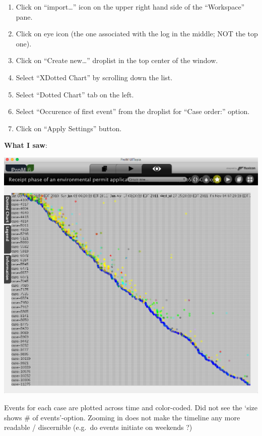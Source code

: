 \documentclass[]{article}
\begin{document}
\begin{enumerate}
\def\labelenumi{\arabic{enumi}.}
\itemsep1pt\parskip0pt
\item
  Click on ``import\ldots{}'' icon on the upper right hand side of the
  ``Workspace'' pane.\\
\item
  Click on eye icon (the one associated with the log in the middle; NOT
  the top one).\\
\item
  Click on ``Create new\ldots{}'' droplist in the top center of the
  window.\\
\item
  Select ``XDotted Chart'' by scrolling down the list.
\item
  Select ``Dotted Chart'' tab on the left.
\item
  Select ``Occurence of first event'' from the droplist for ``Case
  order:'' option.\\
\item
  Click on ``Apply Settings'' button.
\end{enumerate}

\textbf{What I saw}:

\includegraphics{CoSeLoG_Step_04.png}

Events for each case are plotted across time and color-coded. Did not
see the `size shows \# of events'-option. Zooming in does not make the
timeline any more readable / discernible (e.g.~do events initiate on
weekends ?)
\end{document}

